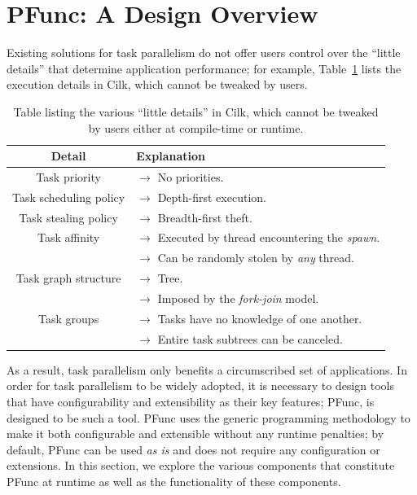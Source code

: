 \section{PFunc: A Design Overview}
\label{sec:pfunc_design}
 
Existing solutions for task parallelism do not offer users control over the
``little details''  that determine application performance; for example, 
Table~\ref{tbl:cilk_runtime} lists the execution details in Cilk, which 
cannot be tweaked by users.
%
\begin{table}
\centering
\begin{tabular}{|c|l|}
\hline
Detail & Explanation \\
\hline
Task priority & $\rightarrow{}$ No priorities. \\
\hline
Task scheduling policy & $\rightarrow{}$ Depth-first execution. \\
\hline
Task stealing policy & $\rightarrow{}$ Breadth-first theft. \\
\hline
Task affinity & $\rightarrow{}$ Executed by thread encountering the \textit{spawn}. \\
              & $\rightarrow{}$ Can be randomly stolen by \textit{any} thread. \\
\hline
Task graph structure & $\rightarrow{}$ Tree. \\
                     & $\rightarrow{}$ Imposed by the \textit{fork-join} model. \\
\hline
Task groups & $\rightarrow{}$ Tasks have no knowledge of one another. \\
            & $\rightarrow{}$ Entire task subtrees can be canceled. \\
\hline
\end{tabular}
\label{tbl:cilk_runtime}
\caption{Table listing the various ``little details'' in Cilk, which cannot be
tweaked by users either at compile-time or runtime.}
\end{table}
%
As a result, task parallelism only benefits a circumscribed set of
applications.
%
In order for task parallelism to be widely adopted, it is necessary to design
tools that have configurability and extensibility as their key features; 
PFunc, is designed to be such a tool.
%
PFunc uses the generic programming methodology to make it both configurable
and extensible without any runtime penalties; by default, PFunc can be used
\emph{as is} and does not require any configuration or extensions.
%
In this section, we explore the various components that constitute PFunc at
runtime as well as the functionality of these components.

